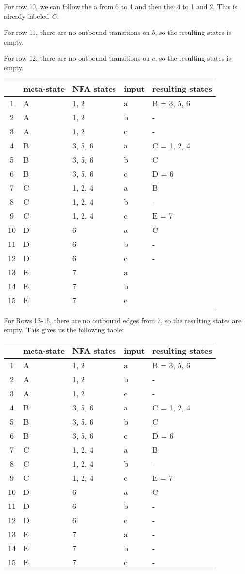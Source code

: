\documentclass[letterpaper,12pt,openany,reqno]{book}%
\begin{document}
For row 10, we can follow the a from 6 to 4 and then the $\Lambda$ to 1 and 2. This is already labeled~$C$.

For row 11, there are no outbound transitions on $b$, so the resulting states is empty.

For row 12, there are no outbound transitions on $c$, so the resulting states is empty.

\begin{center}
\small
\begin{tabular}{c|l|l|l|l}
\hline
& \textbf{meta-state} & \textbf{NFA states} & \textbf{input} & \textbf{resulting states} \\
\hline
1 & A & 1, 2 & a & B = 3, 5, 6 \\
2 & A & 1, 2 & b & - \\
3 & A & 1, 2 & c & - \\
4 & B & 3, 5, 6 & a & C = 1, 2, 4 \\
5 & B & 3, 5, 6 & b & C \\
6 & B & 3, 5, 6 & c & D = 6 \\
7 & C & 1, 2, 4 & a & B\\
8 & C & 1, 2, 4 & b & -\\
9 & C & 1, 2, 4 & c & E = 7 \\
10 & D & 6 & a & C\\
11 & D & 6 & b & -\\
12 & D & 6 & c & -\\
13 & E & 7 & a & \\
14 & E & 7 & b & \\
15 & E & 7 & c & \\
\hline
\end{tabular}
\end{center}

For Rows 13-15, there are no outbound edges from 7, so the resulting states are empty. This gives us the following table:

\begin{center}
\small
\begin{tabular}{c|l|l|l|l}
\hline
& \textbf{meta-state} & \textbf{NFA states} & \textbf{input} & \textbf{resulting states} \\
\hline
1 & A & 1, 2 & a & B = 3, 5, 6 \\
2 & A & 1, 2 & b & - \\
3 & A & 1, 2 & c & - \\
4 & B & 3, 5, 6 & a & C = 1, 2, 4 \\
5 & B & 3, 5, 6 & b & C \\
6 & B & 3, 5, 6 & c & D = 6 \\
7 & C & 1, 2, 4 & a & B\\
8 & C & 1, 2, 4 & b & -\\
9 & C & 1, 2, 4 & c & E = 7 \\
10 & D & 6 & a & C\\
11 & D & 6 & b & -\\
12 & D & 6 & c & -\\
13 & E & 7 & a & -\\
14 & E & 7 & b & -\\
15 & E & 7 & c & -\\
\hline
\end{tabular}
\end{center}
\end{document}
